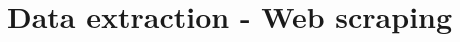\documentclass{standalone}
\begin{document}
\section[Web Scraping]{Data extraction - Web scraping}\label{scraping}

\end{document}
